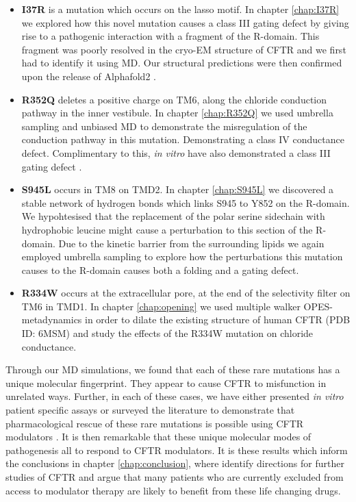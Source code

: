 \begin{itemize}
	\item \textbf{I37R} is a mutation which occurs on the lasso motif. In chapter \ref{chap:I37R} we explored how this novel mutation causes a class III gating defect by giving rise to a pathogenic interaction with a fragment of the R-domain. This fragment was poorly resolved in the cryo-EM structure of CFTR and we first had to identify it using MD. Our structural predictions were then confirmed upon the release of Alphafold2 \cite{jumper2021}.  

	\item \textbf{R352Q} deletes a positive charge on TM6, along the chloride conduction pathway in the inner vestibule. In chapter \ref{chap:R352Q} we used umbrella sampling and unbiased MD to demonstrate the misregulation of the conduction pathway in this mutation. Demonstrating a class IV conductance defect. Complimentary to this, \textit{in vitro} have also demonstrated a class III gating defect \cite{cui2008}. 

	\item \textbf{S945L} occurs in TM8 on TMD2. In chapter \ref{chap:S945L} we discovered a stable network of hydrogen bonds which links S945 to Y852 on the R-domain. We hypohtesised that the replacement of the polar serine sidechain with hydrophobic leucine might cause a perturbation to this section of the R-domain. Due to the kinetic barrier from the surrounding lipids we again employed umbrella sampling to explore how the perturbations this mutation causes to the R-domain causes both a folding and a gating defect.

	\item \textbf {R334W} occurs at the extracellular pore, at the end of the selectivity filter on TM6 in TMD1. In chapter \ref{chap:opening} we used multiple walker OPES-metadynamics in order to dilate the existing structure of human CFTR (PDB ID: 6MSM) and study the effects of the R334W mutation on chloride conductance.

\end{itemize}

Through our MD simulations, we found that each of these rare mutations has a unique molecular fingerprint. They appear to cause CFTR to misfunction in unrelated ways. Further, in each of these cases, we have either presented \textit{in vitro} patient specific assays or surveyed the literature to demonstrate that pharmacological rescue of these rare mutations is possible using CFTR modulators \cite{R334W_Euro_CF_trial}.  It is then remarkable that these unique molecular modes of pathogenesis all to respond to CFTR modulators. It is these results which inform the conclusions in chapter \ref{chap:conclusion}, where identify directions for further studies of CFTR and argue that many patients who are currently excluded from access to modulator therapy are likely to benefit from these life changing drugs. 

